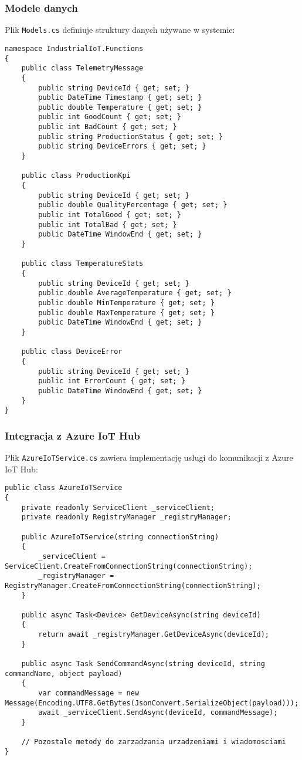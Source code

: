 \documentclass{article}
\begin{document}
\subsubsection{Modele danych}
Plik \texttt{Models.cs} definiuje struktury danych używane w systemie:

\begin{lstlisting}[style=csharp, caption=Models.cs (fragment)]
namespace IndustrialIoT.Functions
{
    public class TelemetryMessage
    {
        public string DeviceId { get; set; }
        public DateTime Timestamp { get; set; }
        public double Temperature { get; set; }
        public int GoodCount { get; set; }
        public int BadCount { get; set; }
        public string ProductionStatus { get; set; }
        public string DeviceErrors { get; set; }
    }
    
    public class ProductionKpi
    {
        public string DeviceId { get; set; }
        public double QualityPercentage { get; set; }
        public int TotalGood { get; set; }
        public int TotalBad { get; set; }
        public DateTime WindowEnd { get; set; }
    }
    
    public class TemperatureStats
    {
        public string DeviceId { get; set; }
        public double AverageTemperature { get; set; }
        public double MinTemperature { get; set; }
        public double MaxTemperature { get; set; }
        public DateTime WindowEnd { get; set; }
    }
    
    public class DeviceError
    {
        public string DeviceId { get; set; }
        public int ErrorCount { get; set; }
        public DateTime WindowEnd { get; set; }
    }
}
\end{lstlisting}

\subsubsection{Integracja z Azure IoT Hub}
Plik \texttt{AzureIoTService.cs} zawiera implementację usługi do komunikacji z Azure IoT Hub:

\begin{lstlisting}[style=csharp, caption=AzureIoTService.cs (fragment)]
public class AzureIoTService
{
    private readonly ServiceClient _serviceClient;
    private readonly RegistryManager _registryManager;
    
    public AzureIoTService(string connectionString)
    {
        _serviceClient = ServiceClient.CreateFromConnectionString(connectionString);
        _registryManager = RegistryManager.CreateFromConnectionString(connectionString);
    }
    
    public async Task<Device> GetDeviceAsync(string deviceId)
    {
        return await _registryManager.GetDeviceAsync(deviceId);
    }
    
    public async Task SendCommandAsync(string deviceId, string commandName, object payload)
    {
        var commandMessage = new Message(Encoding.UTF8.GetBytes(JsonConvert.SerializeObject(payload)));
        await _serviceClient.SendAsync(deviceId, commandMessage);
    }
    
    // Pozostale metody do zarzadzania urzadzeniami i wiadomosciami
}
\end{lstlisting}
\end{document}
